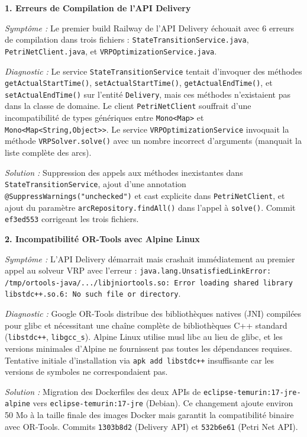 \textbf{1. Erreurs de Compilation de l'API Delivery}

\textit{Symptôme :} Le premier build Railway de l'API Delivery échouait avec 6 erreurs de compilation dans trois fichiers : \texttt{StateTransitionService.java}, \texttt{PetriNetClient.java}, et \texttt{VRPOptimizationService.java}.

\textit{Diagnostic :} Le service \texttt{StateTransitionService} tentait d'invoquer des méthodes \texttt{getActualStartTime()}, \texttt{setActualStartTime()}, \texttt{getActualEndTime()}, et \texttt{setActualEndTime()} sur l'entité \texttt{Delivery}, mais ces méthodes n'existaient pas dans la classe de domaine. Le client \texttt{PetriNetClient} souffrait d'une incompatibilité de types génériques entre \texttt{Mono<Map>} et \texttt{Mono<Map<String,Object>>}. Le service \texttt{VRPOptimizationService} invoquait la méthode \texttt{VRPSolver.solve()} avec un nombre incorrect d'arguments (manquait la liste complète des arcs).

\textit{Solution :} Suppression des appels aux méthodes inexistantes dans \texttt{StateTransitionService}, ajout d'une annotation \texttt{@SuppressWarnings("unchecked")} et cast explicite dans \texttt{PetriNetClient}, et ajout du paramètre \texttt{arcRepository.findAll()} dans l'appel à \texttt{solve()}. Commit \texttt{ef3ed553} corrigeant les trois fichiers.

\textbf{2. Incompatibilité OR-Tools avec Alpine Linux}

\textit{Symptôme :} L'API Delivery démarrait mais crashait immédiatement au premier appel au solveur VRP avec l'erreur : \texttt{java.lang.UnsatisfiedLinkError: /tmp/ortools-java/.../libjniortools.so: Error loading shared library libstdc++.so.6: No such file or directory}.

\textit{Diagnostic :} Google OR-Tools distribue des bibliothèques natives (JNI) compilées pour glibc et nécessitant une chaîne complète de bibliothèques C++ standard (\texttt{libstdc++}, \texttt{libgcc\_s}). Alpine Linux utilise musl libc au lieu de glibc, et les versions minimales d'Alpine ne fournissent pas toutes les dépendances requises. Tentative initiale d'installation via \texttt{apk add libstdc++} insuffisante car les versions de symboles ne correspondaient pas.

\textit{Solution :} Migration des Dockerfiles des deux APIs de \texttt{eclipse-temurin:17-jre-alpine} vers \texttt{eclipse-temurin:17-jre} (Debian). Ce changement ajoute environ 50 Mo à la taille finale des images Docker mais garantit la compatibilité binaire avec OR-Tools. Commits \texttt{1303b8d2} (Delivery API) et \texttt{532b6e61} (Petri Net API).

